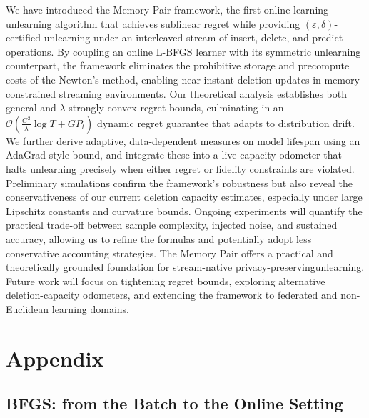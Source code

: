 \documentclass{article}
\theoremstyle{ssltheorem}
\begin{document}
We have introduced the Memory Pair framework, the first online learning–unlearning algorithm that achieves sublinear regret while providing $(\varepsilon, \delta)$-certified unlearning under an interleaved stream of insert, delete, and predict operations.
By coupling an online L-BFGS learner with its symmetric unlearning counterpart, the framework eliminates the prohibitive storage and precompute costs of the Newton's method, enabling near-instant deletion updates in memory-constrained streaming environments.
Our theoretical analysis establishes both general and $\lambda$-strongly convex regret bounds, culminating in an $\mathcal{O}(\tfrac{G^{2}}{\lambda}\log T + G P_{t})$ dynamic regret guarantee that adapts to distribution drift.
We further derive adaptive, data-dependent measures on model lifespan using an AdaGrad-style bound, and integrate these into a live capacity odometer that halts unlearning precisely when either regret or fidelity constraints are violated.
Preliminary simulations confirm the framework’s robustness but also reveal the conservativeness of our current deletion capacity estimates, especially under large Lipschitz constants and curvature bounds.
Ongoing experiments will quantify the practical trade-off between sample complexity, injected noise, and sustained accuracy, allowing us to refine the formulas and potentially adopt less conservative accounting strategies.
The Memory Pair offers a practical and theoretically grounded foundation for stream-native privacy-preservingunlearning.
Future work will focus on tightening regret bounds, exploring alternative deletion-capacity odometers, and extending the framework to federated and non-Euclidean learning domains.
\section{Appendix}

\subsection{BFGS: from the Batch to the Online Setting}
\end{document}
